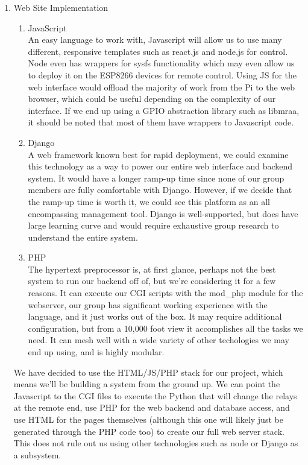 \begin{enumerate}
    \item Web Site Implementation
        \begin{enumerate}
            \item JavaScript \\
            An easy language to work with, Javascript will allow us to use many different, responsive templates such as react.js and node.js for control. Node even has wrappers for sysfs functionality which may even allow us to deploy it on the ESP8266 devices for remote control. Using JS for the web interface would offload the majority of work from the Pi to the web browser, which could be useful depending on the complexity of our interface. If we end up using a GPIO abstraction library such as libmraa, it should be noted that most of them have wrappers to Javascript code.
            \item Django \\
            A web framework known best for rapid deployment, we could examine this technology as a way to power our entire web interface and backend system. It would have a longer ramp-up time since none of our group members are fully comfortable with Django. However, if we decide that the ramp-up time is worth it, we could see this platform as an all encompassing management tool. Django is well-supported, but does have large learning curve and would require exhaustive group research to understand the entire system. 
            \item PHP \\
            The hypertext preprocessor is, at first glance, perhaps not the best system to run our backend off of, but we're considering it for a few reasons. It can execute our CGI scripts with the mod\_php module for the webserver, our group has significant working experience with the language, and it just works out of the box. It may require additional configuration, but from a 10,000 foot view it accomplishes all the tasks we need. It can mesh well with a wide variety of other techologies we may end up using, and is highly modular.
        \end{enumerate}
        We have decided to use the HTML/JS/PHP stack for our project, which means we'll be building a system from the ground up. We can point the Javascript to the CGI files to execute the Python that will change the relays at the remote end, use PHP for the web backend and database access, and use HTML for the pages themselves (although this one will likely just be generated through the PHP code too) to create our full web server stack. This does not rule out us using other technologies such as node or Django as a subsystem.

\end{enumerate}
